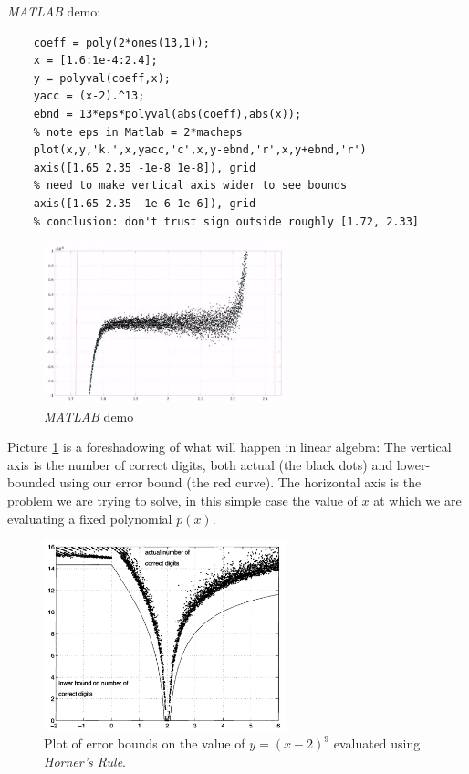 \documentclass[11pt]{article}
\numberwithin{equation}{section}
\begin{document}
\textit{MATLAB} demo:
\begin{verbatim}
    coeff = poly(2*ones(13,1));
    x = [1.6:1e-4:2.4];
    y = polyval(coeff,x);
    yacc = (x-2).^13;
    ebnd = 13*eps*polyval(abs(coeff),abs(x));
    % note eps in Matlab = 2*macheps
    plot(x,y,'k.',x,yacc,'c',x,y-ebnd,'r',x,y+ebnd,'r')
    axis([1.65 2.35 -1e-8 1e-8]), grid
    % need to make vertical axis wider to see bounds
    axis([1.65 2.35 -1e-6 1e-6]), grid
    % conclusion: don't trust sign outside roughly [1.72, 2.33]
\end{verbatim}

\begin{figure}[h]
    \centering
    \includegraphics[width = 7cm]{images/lec2-1.png}
    \caption{\textit{MATLAB} demo}
\end{figure}

Picture \ref{fig:2-1} is a foreshadowing of what will happen in linear algebra: The vertical axis is the number of correct digits, 
both actual (the black dots) and lower-bounded using our error bound (the red curve). The horizontal axis is the problem we are trying to solve,
in this simple case the value of $x$ at which we are evaluating a fixed polynomial $p(x)$. 

\begin{figure}[h]
    \centering
    \includegraphics[width = 7cm]{images/lec2-2.png}
    \caption{Plot of error bounds on the value of $y = (x - 2)^9$ evaluated using \textit{Horner's Rule}.}
    \label{fig:2-1}
\end{figure}
\end{document}

